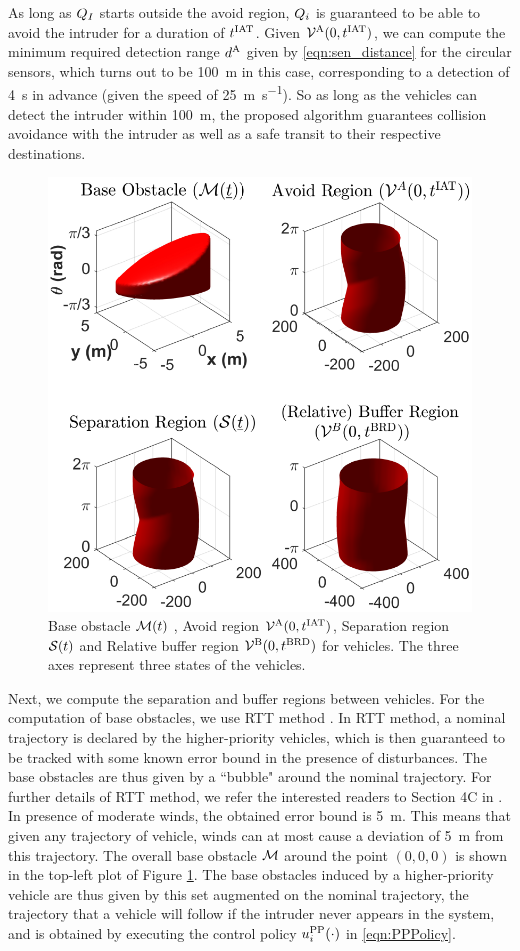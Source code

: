 As long as $Q_{I}$ starts outside the avoid region, $Q_i$ is guaranteed to be able to avoid the intruder for a duration of $t^\text{IAT}$. Given $\mathcal{V}^{\text{A}}(0, t^\text{IAT})$, we can compute the minimum required detection range $d^\text{A}$ given by \eqref{eqn:sen_distance} for the circular sensors, which turns out to be \SI{100}{\m} in this case, corresponding to a detection of \SI{4}{\s} in advance (given the speed of \SI{25}{\m\per\s}). So as long as the vehicles can detect the intruder within \SI{100}{\m}, the proposed algorithm guarantees collision avoidance with the intruder as well as a safe transit to their respective destinations.   
\begin{figure}
  \centering
  \includegraphics[width=0.7\columnwidth]{"figs/bufferRegion_steps"}
  \caption{Base obstacle $\mathcal{M}(t)$ , Avoid region $\mathcal{V}^{\text{A}}(0, t^\text{IAT})$, Separation region $\mathcal{S}(t)$ and Relative buffer region $\mathcal{V}^{\text{B}}(0, t^\text{BRD})$ for vehicles. The three axes represent three states of the vehicles.}
  \label{fig:MaxMin}
\end{figure}

Next, we compute the separation and buffer regions between vehicles. For the computation of base obstacles, we use RTT method \cite{Bansal2017}. In RTT method, a nominal trajectory is declared by the higher-priority vehicles, which is then guaranteed to be tracked with some known error bound in the presence of disturbances. The base obstacles are thus given by a ``bubble" around the nominal trajectory. For further details of RTT method, we refer the interested readers to Section 4C in \cite{Bansal2017}. In presence of moderate winds, the obtained error bound is \SI{5}{\m}. This means that given any trajectory of vehicle, winds can at most cause a deviation of \SI{5}{\m} from this trajectory. The overall base obstacle $\mathcal{M}$ around the point $(0, 0, 0)$ is shown in the top-left plot of Figure \ref{fig:MaxMin}. The base obstacles induced by a higher-priority vehicle are thus given by this set augmented on the nominal trajectory, the trajectory that a vehicle will follow if the intruder never appears in the system, and is obtained by executing the control policy ${u^{\text{PP}}_{i}}(\cdot)$ in \eqref{eqn:PPPolicy}.

